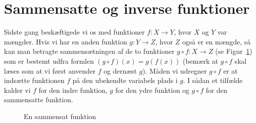 \section{Sammensatte og inverse funktioner}
Sidste gang beskæftigede vi os med funktioner $f \colon X \to Y$, hvor $X$ og $Y$ var mængder. Hvis vi har en anden funktion $g \colon Y \to Z$, hvor $Z$ også er en mængde, så kan man betragte sammensætningen af de to funktioner $g \circ f  \colon X \to Z$ (se Figur~\ref{fig:funktioner2et}) som er bestemt udfra formlen $(g \circ f)(x)=g(f(x))$ (bemærk at $g \circ f$ skal læses som at vi først anvender $f$ og dernæst $g$). Måden vi udregner $g \circ f$ er at indsætte funktionen $f$ på den ubekendte variabels plads  i $g$. I sådan et tilfælde kalder vi $f$ for den indre funktion, $g$ for den ydre funktion og $g \circ f$ for den sammensatte funktion.

\begin{figure}[!htbp]
  \pgfplotsset{width=0.5\textwidth,compat=1.11}
  \centering
  \caption{En sammensat funktion}
  \label{fig:funktioner2et}
\end{figure}


